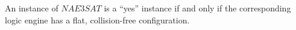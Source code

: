 % 
% 
% 
\begin{thm}\label{thm:Satisfiability-1}
 An instance of $NAE3SAT$ is a ``yes'' instance if and only if the corresponding logic engine has a
flat, collision-free configuration.
\end{thm}
